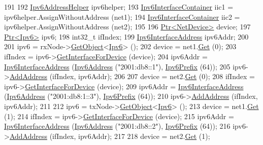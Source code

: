 \begin{DoxyCode}
191 
192   \hyperlink{classns3_1_1Ipv6AddressHelper}{Ipv6AddressHelper} ipv6helper;
193   \hyperlink{classns3_1_1Ipv6InterfaceContainer}{Ipv6InterfaceContainer} iic1 = ipv6helper.AssignWithoutAddress (net1);
194   \hyperlink{classns3_1_1Ipv6InterfaceContainer}{Ipv6InterfaceContainer} iic2 = ipv6helper.AssignWithoutAddress (net2);
195 
196   \hyperlink{classns3_1_1Ptr}{Ptr<NetDevice>} device;
197   \hyperlink{classns3_1_1Ptr}{Ptr<Ipv6>} ipv6;
198   int32\_t ifIndex;
199   \hyperlink{classns3_1_1Ipv6InterfaceAddress}{Ipv6InterfaceAddress} ipv6Addr;
200 
201   ipv6 = rxNode->\hyperlink{classns3_1_1Object_a13e18c00017096c8381eb651d5bd0783}{GetObject}<\hyperlink{classns3_1_1Ipv6}{Ipv6}> ();
202   device = net1.\hyperlink{classns3_1_1NetDeviceContainer_a677d62594b5c9d2dea155cc5045f4d0b}{Get} (0);
203   ifIndex = ipv6->\hyperlink{classns3_1_1Ipv6_a3337dc6ce66612b0fa9b57f7f0338745}{GetInterfaceForDevice} (device);
204   ipv6Addr = \hyperlink{classns3_1_1Ipv6InterfaceAddress}{Ipv6InterfaceAddress} (\hyperlink{classns3_1_1Ipv6Address}{Ipv6Address} (\textcolor{stringliteral}{"2001:db8::1"}), 
      \hyperlink{classns3_1_1Ipv6Prefix}{Ipv6Prefix} (64));
205   ipv6->\hyperlink{classns3_1_1Ipv6_a5cd576e83cf65445be3a0b5ffd1ddc5c}{AddAddress} (ifIndex, ipv6Addr);
206 
207   device = net2.\hyperlink{classns3_1_1NetDeviceContainer_a677d62594b5c9d2dea155cc5045f4d0b}{Get} (0);
208   ifIndex = ipv6->\hyperlink{classns3_1_1Ipv6_a3337dc6ce66612b0fa9b57f7f0338745}{GetInterfaceForDevice} (device);
209   ipv6Addr = \hyperlink{classns3_1_1Ipv6InterfaceAddress}{Ipv6InterfaceAddress} (\hyperlink{classns3_1_1Ipv6Address}{Ipv6Address} (\textcolor{stringliteral}{"2001:db8:1::3"}), 
      \hyperlink{classns3_1_1Ipv6Prefix}{Ipv6Prefix} (64));
210   ipv6->\hyperlink{classns3_1_1Ipv6_a5cd576e83cf65445be3a0b5ffd1ddc5c}{AddAddress} (ifIndex, ipv6Addr);
211 
212   ipv6 = txNode->\hyperlink{classns3_1_1Object_a13e18c00017096c8381eb651d5bd0783}{GetObject}<\hyperlink{classns3_1_1Ipv6}{Ipv6}> ();
213   device = net1.\hyperlink{classns3_1_1NetDeviceContainer_a677d62594b5c9d2dea155cc5045f4d0b}{Get} (1);
214   ifIndex = ipv6->\hyperlink{classns3_1_1Ipv6_a3337dc6ce66612b0fa9b57f7f0338745}{GetInterfaceForDevice} (device);
215   ipv6Addr = \hyperlink{classns3_1_1Ipv6InterfaceAddress}{Ipv6InterfaceAddress} (\hyperlink{classns3_1_1Ipv6Address}{Ipv6Address} (\textcolor{stringliteral}{"2001:db8::2"}), 
      \hyperlink{classns3_1_1Ipv6Prefix}{Ipv6Prefix} (64));
216   ipv6->\hyperlink{classns3_1_1Ipv6_a5cd576e83cf65445be3a0b5ffd1ddc5c}{AddAddress} (ifIndex, ipv6Addr);
217 
218   device = net2.\hyperlink{classns3_1_1NetDeviceContainer_a677d62594b5c9d2dea155cc5045f4d0b}{Get} (1);

\end{DoxyCode}
